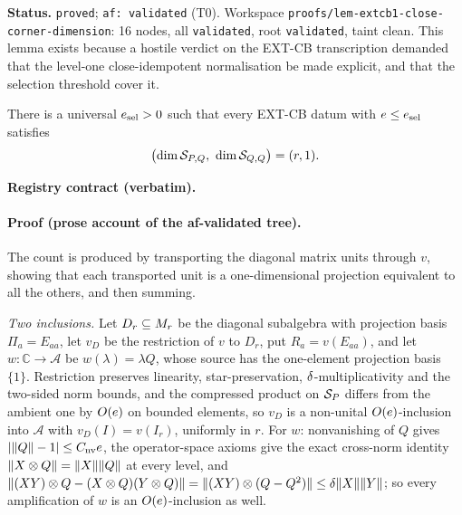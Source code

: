 \medskip
\noindent\textbf{Status.} \texttt{proved}; \texttt{af: validated} (T0). Workspace
\texttt{proofs/lem-extcb1-close-corner-dimension}: 16 nodes, all \texttt{validated}, root
\texttt{validated}, taint clean. This lemma exists because a hostile verdict on the EXT-CB
transcription demanded that the level-one close-idempotent normalisation be made
explicit, and that the selection threshold cover it.

\begin{lemma}\label{lem:extcb1-cross-corner-dimension}
There is a universal $e_{\mathrm{sel}}>0$ such that every EXT-CB datum with
$e\le e_{\mathrm{sel}}$ satisfies
\begin{equation}\label{eq:sel-main}
  \bigl(\dim\mathcal S_{P,Q},\ \dim\mathcal S_{Q,Q}\bigr)=(r,1).
\end{equation}
\end{lemma}

\noindent\textbf{Registry contract (verbatim).}

\paragraph{Proof (prose account of the af-validated tree).}
The count is produced by transporting the diagonal matrix units through $v$, showing that
each transported unit is a one-dimensional projection equivalent to all the others, and
then summing.

\emph{Two inclusions.} Let $D_r\subseteq M_{r}$ be the diagonal subalgebra with
projection basis $\Pi_a=E_{aa}$, let $v_D$ be the restriction of $v$ to $D_r$, put
$R_a=v(E_{aa})$, and let $w:\mathbb C\to\mathcal A$ be $w(\lambda)=\lambda Q$, whose
source has the one-element projection basis $\{1\}$. Restriction preserves linearity,
star-preservation, $\delta$-multiplicativity and the two-sided norm bounds, and the
compressed product on $\mathcal S_{P}$ differs from the ambient one by $O(e)$ on bounded
elements, so $v_D$ is a non-unital $O(e)$-inclusion into $\mathcal A$ with
$v_D(I)=v(I_r)$, uniformly in $r$. For $w$: nonvanishing of $Q$ gives
$\lvert\lVert Q\rVert-1\rvert\le C_{\mathrm{nv}}e$, the operator-space axioms give the exact
cross-norm identity $\lVert X\otimes Q\rVert=\lVert X\rVert\lVert Q\rVert$ at every level, and
$\lVert (XY)\otimes Q-(X\otimes Q)(Y\otimes Q)\rVert=\lVert (XY)\otimes(Q-Q^{2})\rVert\le\delta\lVert X\rVert\lVert Y\rVert$;
so every amplification of $w$ is an $O(e)$-inclusion as well.

